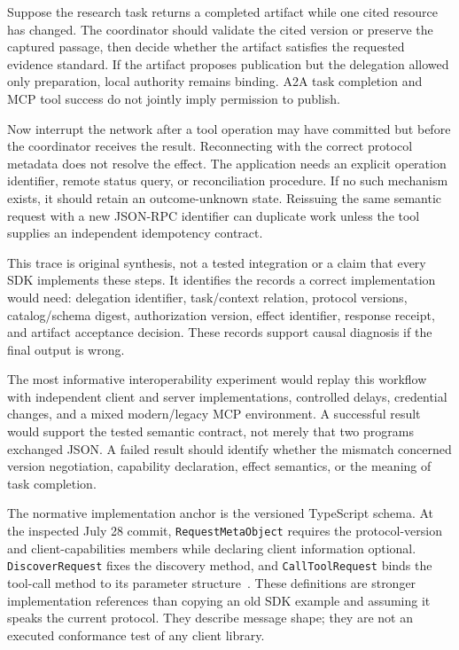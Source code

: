 Suppose the research task returns a completed artifact while one cited resource has changed. The coordinator should validate the cited version or preserve the captured passage, then decide whether the artifact satisfies the requested evidence standard. If the artifact proposes publication but the delegation allowed only preparation, local authority remains binding. A2A task completion and MCP tool success do not jointly imply permission to publish.

Now interrupt the network after a tool operation may have committed but before the coordinator receives the result. Reconnecting with the correct protocol metadata does not resolve the effect. The application needs an explicit operation identifier, remote status query, or reconciliation procedure. If no such mechanism exists, it should retain an outcome-unknown state. Reissuing the same semantic request with a new JSON-RPC identifier can duplicate work unless the tool supplies an independent idempotency contract.

This trace is original synthesis, not a tested integration or a claim that every SDK implements these steps. It identifies the records a correct implementation would need: delegation identifier, task/context relation, protocol versions, catalog/schema digest, authorization version, effect identifier, response receipt, and artifact acceptance decision. These records support causal diagnosis if the final output is wrong.

The most informative interoperability experiment would replay this workflow with independent client and server implementations, controlled delays, credential changes, and a mixed modern/legacy MCP environment. A successful result would support the tested semantic contract, not merely that two programs exchanged JSON. A failed result should identify whether the mismatch concerned version negotiation, capability declaration, effect semantics, or the meaning of task completion.

The normative implementation anchor is the versioned TypeScript schema. At the inspected July 28 commit, \texttt{RequestMetaObject} requires the protocol-version and client-capabilities members while declaring client information optional. \texttt{DiscoverRequest} fixes the discovery method, and \texttt{CallToolRequest} binds the tool-call method to its parameter structure~\cite{mcp2026schema}. These definitions are stronger implementation references than copying an old SDK example and assuming it speaks the current protocol. They describe message shape; they are not an executed conformance test of any client library.

